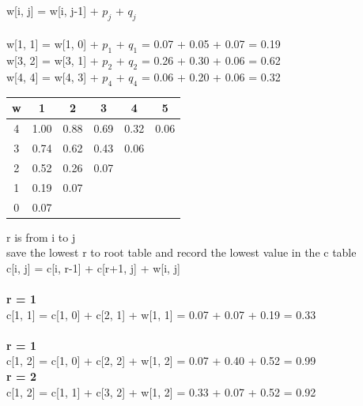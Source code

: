 \documentclass{article}
\begin{document}
w[i, j] = w[i, j-1] + $p_{j}$ + $q_{j}$\\
\\
w[1, 1] = w[1, 0] + $p_{1}$ + $q_{1}$ = 0.07 + 0.05 + 0.07 = 0.19 \\
w[3, 2] = w[3, 1] + $p_{2}$ + $q_{2}$ = 0.26 + 0.30 + 0.06 = 0.62 \\
w[4, 4] = w[4, 3] + $p_{4}$ + $q_{4}$ = 0.06 + 0.20 + 0.06 = 0.32 \\

\begin{tabular}{ c | c | c | c | c | c}         
w & 1 & 2 & 3 & 4 & 5 \\ 
\hline 4 & 1.00 & 0.88 & 0.69 & 0.32 & 0.06 \\  
\hline 3 & 0.74 & 0.62 & 0.43 & 0.06 \\
\hline 2 & 0.52 & 0.26 & 0.07 \\
\hline 1 & 0.19 & 0.07 \\   
\hline 0 & 0.07        
\end{tabular}

r is from i to j \\
save the lowest r to root table and record the lowest value in the c table\\
c[i, j] = c[i, r-1] + c[r+1, j] + w[i, j]\\
\\
\textbf{r = 1} \\
c[1, 1] = c[1, 0] + c[2, 1] + w[1, 1] = 0.07 + 0.07 + 0.19 = 0.33\\
\\
\textbf{r = 1} \\
c[1, 2] = c[1, 0] + c[2, 2] + w[1, 2] = 0.07 + 0.40 + 0.52 = 0.99\\
\textbf{r = 2} \\
c[1, 2] = c[1, 1] + c[3, 2] + w[1, 2] = 0.33 + 0.07 + 0.52 = 0.92\\
\end{document}
